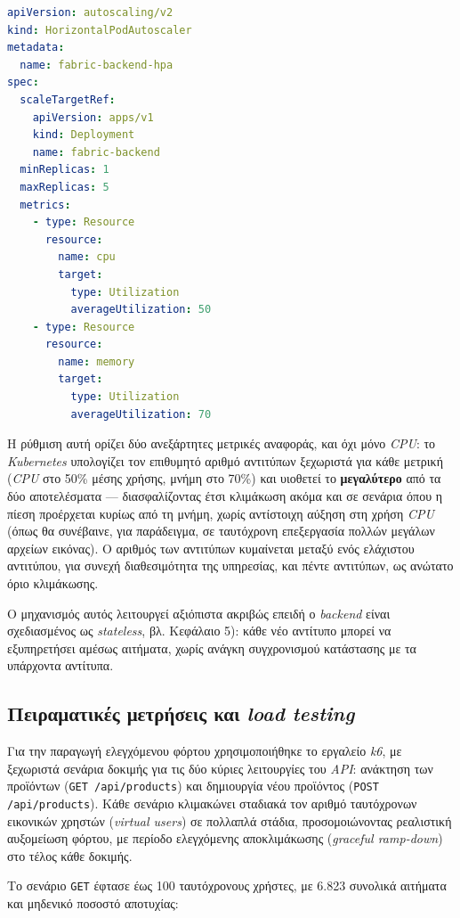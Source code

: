 \begin{lstlisting}[language=yaml, caption={HorizontalPodAutoscaler manifest για το backend}]
apiVersion: autoscaling/v2
kind: HorizontalPodAutoscaler
metadata:
  name: fabric-backend-hpa
spec:
  scaleTargetRef:
    apiVersion: apps/v1
    kind: Deployment
    name: fabric-backend
  minReplicas: 1
  maxReplicas: 5
  metrics:
    - type: Resource
      resource:
        name: cpu
        target:
          type: Utilization
          averageUtilization: 50
    - type: Resource
      resource:
        name: memory
        target:
          type: Utilization
          averageUtilization: 70
\end{lstlisting}

Η ρύθμιση αυτή ορίζει δύο ανεξάρτητες μετρικές αναφοράς, και όχι μόνο \textit{CPU}: το \textit{Kubernetes} υπολογίζει τον επιθυμητό αριθμό αντιτύπων ξεχωριστά για κάθε μετρική (\textit{CPU} στο 50\% μέσης χρήσης, μνήμη στο 70\%) και υιοθετεί το \textbf{μεγαλύτερο} από τα δύο αποτελέσματα --- διασφαλίζοντας έτσι κλιμάκωση ακόμα και σε σενάρια όπου η πίεση προέρχεται κυρίως από τη μνήμη, χωρίς αντίστοιχη αύξηση στη χρήση \textit{CPU} (όπως θα συνέβαινε, για παράδειγμα, σε ταυτόχρονη επεξεργασία πολλών μεγάλων αρχείων εικόνας). Ο αριθμός των αντιτύπων κυμαίνεται μεταξύ ενός ελάχιστου αντιτύπου, για συνεχή διαθεσιμότητα της υπηρεσίας, και πέντε αντιτύπων, ως ανώτατο όριο κλιμάκωσης.

Ο μηχανισμός αυτός λειτουργεί αξιόπιστα ακριβώς επειδή ο \textit{backend} είναι σχεδιασμένος ως \textit{stateless}, βλ. Κεφάλαιο 5): κάθε νέο αντίτυπο μπορεί να εξυπηρετήσει αμέσως αιτήματα, χωρίς ανάγκη συγχρονισμού κατάστασης με τα υπάρχοντα αντίτυπα.


\subsection{Πειραματικές μετρήσεις και \textit{load testing}}

Για την παραγωγή ελεγχόμενου φόρτου χρησιμοποιήθηκε το εργαλείο \textit{k6}, με ξεχωριστά σενάρια δοκιμής για τις δύο κύριες λειτουργίες του \textit{API}: ανάκτηση των προϊόντων (\texttt{GET /api/products}) και δημιουργία νέου προϊόντος (\texttt{POST /api/products}). Κάθε σενάριο κλιμακώνει σταδιακά τον αριθμό ταυτόχρονων εικονικών χρηστών (\textit{virtual users}) σε πολλαπλά στάδια, προσομοιώνοντας ρεαλιστική αυξομείωση φόρτου, με περίοδο ελεγχόμενης αποκλιμάκωσης (\textit{graceful ramp-down}) στο τέλος κάθε δοκιμής.

Το σενάριο \texttt{GET} έφτασε έως 100 ταυτόχρονους χρήστες, με 6.823 συνολικά αιτήματα και μηδενικό ποσοστό αποτυχίας:

